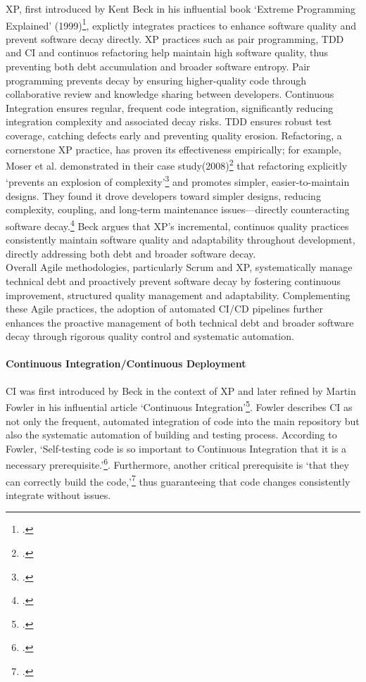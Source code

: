\ac{XP}, first introduced by Kent Beck in his influential book `Extreme Programming Explained' (1999)\footcite{beckExtremeProgrammingExplained1999},
explictly integrates practices to enhance software quality and prevent software decay directly.
\ac{XP} practices such as pair programming, \ac{TDD} and \ac{CI} and continuos refactoring help maintain high software quality, thus preventing both debt accumulation
and broader software entropy.
Pair programming prevents decay by ensuring higher-quality code through collaborative review and knowledge sharing between developers.
Continuous Integration ensures regular, frequent code integration, significantly reducing integration complexity and associated decay risks.
\ac{TDD} ensures robust test coverage, catching defects early and preventing quality erosion.
Refactoring, a cornerstone XP practice, has proven its effectiveness empirically; for example, Moser et al.
demonstrated in their case study(2008)\footcite{moserCaseStudyImpact2008} that refactoring explicitly `prevents an explosion of complexity'\footcite[262]{moserCaseStudyImpact2008}
and promotes simpler, easier-to-maintain designs.
They found it drove developers toward simpler designs, reducing complexity, coupling, and long-term maintenance issues—directly counteracting software decay.\footcite[262]{moserCaseStudyImpact2008}
Beck argues that \ac{XP}'s incremental, continuos quality practices consistently maintain software quality and adaptability throughout development, directly addressing both debt and broader software decay.\\
Overall Agile methodologies, particularly Scrum and \ac{XP}, systematically manage technical debt and proactively prevent software decay by fostering continuous improvement, structured quality management and adaptability.
Complementing these Agile practices, the adoption of automated \ac{CI/CD} pipelines further enhances the proactive management of both technical debt
and broader software decay through rigorous quality control and systematic automation.\\

\paragraph{Continuous Integration/Continuous Deployment}
\ac{CI} was first introduced by Beck in the context of \ac{XP} and later refined by Martin Fowler in his influential article `Continuous Integration'\footcite{ContinuousIntegration}.
Fowler describes \ac{CI} as not only the frequent, automated integration of code into the main repository but also the systematic automation of building and testing process.
According to Fowler, `Self-testing code is so important to Continuous Integration that it is a necessary prerequisite.'\footcite{ContinuousIntegration}.
Furthermore, another critical prerequisite is `that they can correctly build the code,'\footcite{ContinuousIntegration} thus guaranteeing that code changes consistently
integrate without issues.\\

